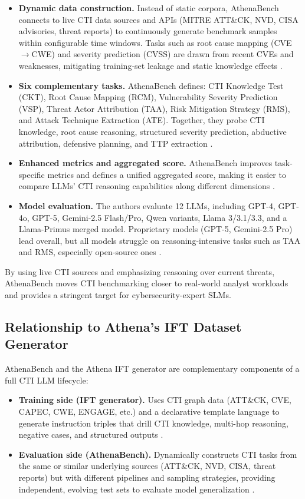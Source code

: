\documentclass[unnumsec,webpdf,contemporary,large]{oup-authoring-template}
\theoremstyle{thmstyleone}
\theoremstyle{thmstyletwo}
\theoremstyle{thmstylethree}
\begin{document}
\begin{itemize}
  \item \textbf{Dynamic data construction.} Instead of static corpora, AthenaBench connects to live CTI data sources and APIs (MITRE ATT\&CK, NVD, CISA advisories, threat reports) to continuously generate benchmark samples within configurable time windows. Tasks such as root cause mapping (CVE$\rightarrow$CWE) and severity prediction (CVSS) are drawn from recent CVEs and weaknesses, mitigating training-set leakage and static knowledge effects \cite{alam2025athenabench}.
  \item \textbf{Six complementary tasks.} AthenaBench defines: CTI Knowledge Test (CKT), Root Cause Mapping (RCM), Vulnerability Severity Prediction (VSP), Threat Actor Attribution (TAA), Risk Mitigation Strategy (RMS), and Attack Technique Extraction (ATE). Together, they probe CTI knowledge, root cause reasoning, structured severity prediction, abductive attribution, defensive planning, and TTP extraction \cite{alam2025athenabench}.
  \item \textbf{Enhanced metrics and aggregated score.} AthenaBench improves task-specific metrics and defines a unified aggregated score, making it easier to compare LLMs' CTI reasoning capabilities along different dimensions \cite{alam2025athenabench}.
  \item \textbf{Model evaluation.} The authors evaluate 12 LLMs, including GPT-4, GPT-4o, GPT-5, Gemini-2.5 Flash/Pro, Qwen variants, Llama 3/3.1/3.3, and a Llama-Primus merged model. Proprietary models (GPT-5, Gemini-2.5 Pro) lead overall, but all models struggle on reasoning-intensive tasks such as TAA and RMS, especially open-source ones \cite{alam2025athenabench}.
\end{itemize}

By using live CTI sources and emphasizing reasoning over current threats, AthenaBench moves CTI benchmarking closer to real-world analyst workloads and provides a stringent target for cybersecurity-expert SLMs.

\subsection{Relationship to Athena's IFT Dataset Generator}

AthenaBench and the Athena IFT generator are complementary components of a full CTI LLM lifecycle:

\begin{itemize}
  \item \textbf{Training side (IFT generator).} Uses CTI graph data (ATT\&CK, CVE, CAPEC, CWE, ENGAGE, etc.) and a declarative template language to generate instruction triples that drill CTI knowledge, multi-hop reasoning, negative cases, and structured outputs \cite{cardei2025ift}.
  \item \textbf{Evaluation side (AthenaBench).} Dynamically constructs CTI tasks from the same or similar underlying sources (ATT\&CK, NVD, CISA, threat reports) but with different pipelines and sampling strategies, providing independent, evolving test sets to evaluate model generalization \cite{alam2025athenabench}.
\end{itemize}
\end{document}
